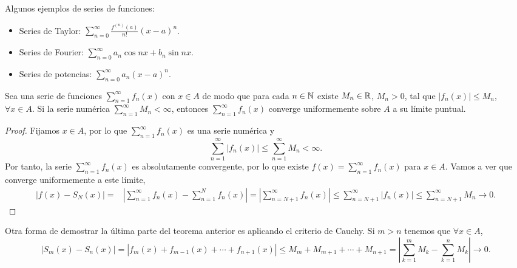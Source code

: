 \begin{eg}
\normalfont Algunos ejemplos de series de funciones:
\begin{itemize}
\item Series de Taylor: $\displaystyle \sum^{\infty}_{n = 0}\frac{f^{\left(n\right)}\left(a\right)}{n!}\left(x-a\right)^{n} $.
\item Series de Fourier: $\displaystyle \sum^{\infty}_{n = 0}a_{n}\cos nx + b_{n}\sin nx $.
\item Series de potencias: $\displaystyle \sum^{\infty}_{n = 0}a_{n}\left(x-a\right)^{n} $.
\end{itemize}
\end{eg}
\begin{ftheorem}
\normalfont Sea una serie de funciones $\displaystyle \sum^{\infty}_{n = 1}f_{n}\left(x\right) $ con $\displaystyle x \in A $ de modo que para cada $\displaystyle n \in \mathbb{N} $ existe $\displaystyle M_{n} \in \mathbb{R} $, $\displaystyle M_{n} > 0 $, tal que $\displaystyle \left|f_{n}\left(x\right)\right| \leq M_{n} $, $\displaystyle \forall x \in A $. Si la serie numérica $\displaystyle \sum^{\infty}_{n = 1}M_{n} < \infty $, entonces $\displaystyle \sum^{\infty}_{n = 1}f_{n}\left(x\right) $ converge uniformemente sobre $\displaystyle A $ a su límite puntual.
\end{ftheorem}
\begin{proof}
Fijamos $\displaystyle x \in A $, por lo que $\displaystyle \sum^{\infty}_{n = 1}f_{n}\left(x\right) $ es una serie numérica y 
\[\sum^{\infty}_{n = 1} \left|f_{n}\left(x\right)\right| \leq \sum^{\infty}_{n = 1}M_{n} < \infty .\]
Por tanto, la serie $\displaystyle \sum^{\infty}_{n = 1}f_{n}\left(x\right) $ es absolutamente convergente, por lo que existe $\displaystyle f\left(x\right) = \sum^{\infty}_{n = 1}f_{n}\left(x\right) $ para $\displaystyle x \in A $. Vamos a ver que converge uniformemente a este límite,
\[
\begin{split}
	\left|f\left(x\right)-S_{N}\left(x\right)\right| = & \left|\sum^{\infty}_{n = 1}f_{n}\left(x\right)-\sum^{N}_{n = 1}f_{n}\left(x\right)\right| = \left|\sum^{\infty}_{n = N+1}f_{n}\left(x\right)\right| \leq \sum^{\infty}_{n = N+1} \left|f_{n}\left(x\right)\right| \leq \sum^{\infty}_{n = N + 1}M_{n} \to 0 .
\end{split}
\]
\end{proof}
\begin{observation}
\normalfont Otra forma de demostrar la última parte del teorema anterior es aplicando el criterio de Cauchy. Si $\displaystyle m > n $ tenemos que $\displaystyle \forall x \in A $,
\[ \left|S_{m}\left(x\right)-S_{n}\left(x\right)\right|= \left|f_{m}\left(x\right) + f_{m - 1}\left(x\right) + \cdots + f_{n + 1}\left(x\right)\right| \leq M_{m} + M_{m+1} + \cdots + M_{n+1} = \left|\sum^{m}_{k=1}M_{k}-\sum^{n}_{k=1}M_{k}\right|\to 0 .\]
\end{observation}

